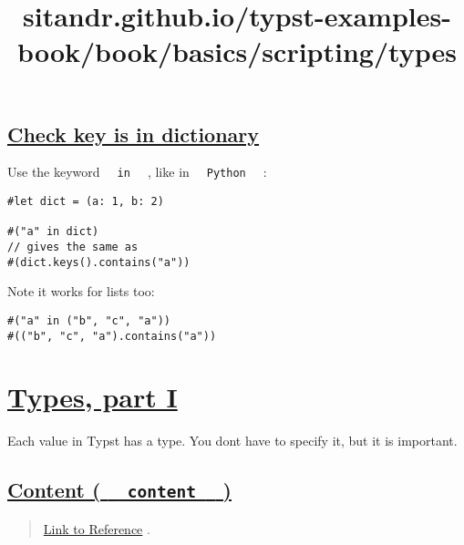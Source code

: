 \pandocbounded{}

\subsection{\texorpdfstring{\hyperref[check-key-is-in-dictionary]{Check
key is in
dictionary}}{Check key is in dictionary}}\label{check-key-is-in-dictionary}

Use the keyword \texttt{\ }{\texttt{\ in\ }}\texttt{\ } , like in
\texttt{\ }{\texttt{\ Python\ }}\texttt{\ } :

\begin{verbatim}
#let dict = (a: 1, b: 2)

#("a" in dict)
// gives the same as
#(dict.keys().contains("a"))
\end{verbatim}

\pandocbounded{}

Note it works for lists too:

\begin{verbatim}
#("a" in ("b", "c", "a"))
#(("b", "c", "a").contains("a"))
\end{verbatim}

\pandocbounded{}


\title{sitandr.github.io/typst-examples-book/book/basics/scripting/types}

\section{\texorpdfstring{\hyperref[types-part-i]{Types, part
I}}{Types, part I}}\label{types-part-i}

Each value in Typst has a type. You don\textquotesingle t have to
specify it, but it is important.

\subsection{\texorpdfstring{\hyperref[content-content]{Content (
\texttt{\ }{\texttt{\ content\ }}\texttt{\ }
)}}{Content (   content   )}}\label{content-content}

\begin{quote}
\href{https://typst.app/docs/reference/foundations/content/}{Link to
Reference} .
\end{quote}

